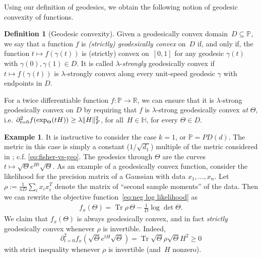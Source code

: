\documentclass[aos]{imsart}
\theoremstyle{definition}
\newtheorem{definition}[theorem]{Definition}
\newtheorem{example}[theorem]{Example}
\numberwithin{equation}{section}
\DeclareMathOperator{\tr}{Tr}
\DeclarePairedDelimiter{\norm}{\lVert}{\rVert}
\newcommand{\R}{{\mathbb{R}}}
\renewcommand{\P}{{\mathbb{P}}}
\renewcommand{\H}{{\mathbb{H}}}
\newcommand{\MW}[1]{{\color{red}[MW: #1]}}
\newcommand{\MW}[1]{{}}
\begin{document}
Using our definition of geodesics, we obtain the following notion of geodesic convexity of functions.

\begin{definition}[Geodesic convexity]
Given a geodesically convex domain~$D \subseteq \P$, we say that a function $f$ is \emph{(strictly) geodesically convex} on~$D$ if, and only if, the function $t \mapsto f(\gamma(t))$ is (strictly) convex on~$[0,1]$ for any geodesic $\gamma(t)$ with $\gamma(0),\gamma(1)\in D$. It is called $\lambda$-\emph{strongly} geodesically convex if $t \mapsto f(\gamma(t))$ is $\lambda$-strongly convex along every unit-speed geodesic $\gamma$ with endpoints in $D$.

For a twice differentiable function $f\colon \P \to \R$, we can ensure that it is $\lambda$-strong geodesically convex on $D$ by requiring that $f$ is $\lambda$-strong geodesically convex \emph{at} $\Theta$, i.e. $\partial^2_{t=0} f(\exp_\Theta(tH)) \geq \lambda \norm H_F^2$, for all~$H\in\H$, for every $\Theta \in D$.
\end{definition}

\begin{example}\label{exa:usual-likelihood} It is instructive to consider the case $k = 1$, or $\P = PD(d)$.
The metric in this case is simply a constant ($1/\sqrt{d_1}$) multiple of the metric considered in \citep{bhatia2009positive,skovgaard1984riemannian}; c.f. \cref{eq:fisher-vs-geo}.
The geodesics through $\Theta$ are the curves $t \mapsto \sqrt{\Theta} e^{H t} \sqrt{\Theta}.$ As an example of a geodesically convex function, consider the likelihood for the precision matrix of a Gaussian with data $x_1, \dots, x_n$.
Let $\rho := \frac1{nD}\sum_i x_i x_i^T$ denote the matrix of ``second sample moments'' of the data.
Then we can rewrite the objective function~\eqref{eq:neg log likelihood} as
\begin{align*}%
  f_x(\Theta) = \tr \rho \, \Theta - \frac1D \log \det \Theta.
\end{align*}
We claim that $f_x(\Theta)$ is always geodesically convex, and in fact \emph{strictly} geodesically convex whenever $\rho$ is invertible. Indeed,
$$ \partial^2_{t = 0} f_x(\sqrt{\Theta} e^{t H} \sqrt{\Theta}) = \tr \sqrt{\Theta} \rho \sqrt{\Theta} H^2 \geq 0 $$
with strict inequality whenever $\rho$ is invertible (and~$H$ nonzero).
\end{example}
\end{document}
